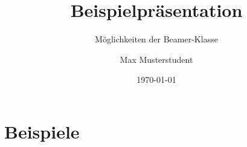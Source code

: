 


\title{Beispielpräsentation}
\subtitle{Möglichkeiten der Beamer-Klasse}
\author{Max Musterstudent}
\date{\today}



	\part{Beispiele}
	


